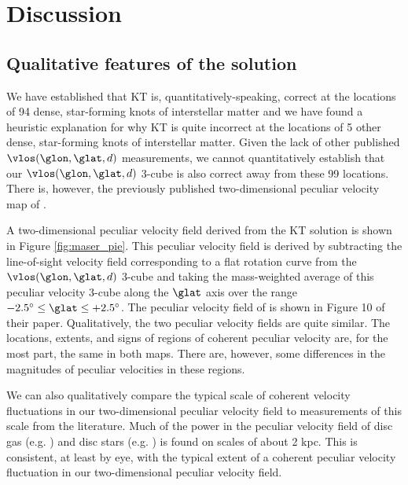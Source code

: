 \section{Discussion}
\label{sec:discussion}
\subsection{Qualitative features of the solution}
\label{sec:discussion-qualitative}
We have established that KT is, quantitatively-speaking, correct at the locations of 94 dense, star-forming knots of interstellar matter and we have found a heuristic explanation for why KT is quite incorrect at the locations of 5 other dense, star-forming knots of interstellar matter.
Given the lack of other published $\vlos(\glon, \glat, d)$ measurements, we cannot quantitatively establish that our $\vlos(\glon, \glat, d)$ 3-cube is also correct away from these 99 locations.
There is, however, the previously published two-dimensional peculiar velocity map of \citet{1993A&A...275...67B}.

A two-dimensional peculiar velocity field derived from the KT solution is shown in Figure \ref{fig:maser_pie}.
This peculiar velocity field is derived by subtracting the line-of-sight velocity field corresponding to a flat rotation curve from the $\vlos(\glon, \glat, d)$ 3-cube and taking the mass-weighted average of this peculiar velocity 3-cube along the $\glat$ axis over the range $-2.5^\circ \leq \glat \leq +2.5^\circ$.
The peculiar velocity field of \citet{1993A&A...275...67B} is shown in Figure 10 of their paper. 
Qualitatively, the two peculiar velocity fields are quite similar. 
The locations, extents, and signs of regions of coherent peculiar velocity are, for the most part, the same in both maps. 
There are, however, some differences in the magnitudes of peculiar velocities in these regions.

We can also qualitatively compare the typical scale of coherent velocity fluctuations in our two-dimensional peculiar velocity field to measurements of this scale from the literature. 
Much of the power in the peculiar velocity field of disc gas (e.g. \citealt{Clemens:1985dp}) and disc stars (e.g. \citealt{2015ApJ...800...83B}) is found on scales of about 2 kpc.
This is consistent, at least by eye, with the typical extent of a coherent peculiar velocity fluctuation in our two-dimensional peculiar velocity field.

